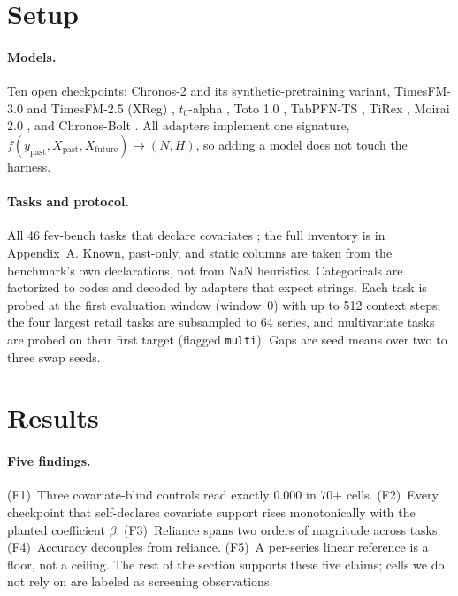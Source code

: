 \documentclass[letterpaper]{article}
\begin{document}
\section{Setup}
\paragraph{Models.} Ten open checkpoints: Chronos-2 \citep{ansari2025chronos2} and its
synthetic-pretraining variant, TimesFM-3.0 and TimesFM-2.5 (XReg)
\citep{das2024timesfm}, $t_0$-alpha \citep{meyer2026t0}, Toto 1.0 \citep{toto2024},
TabPFN-TS \citep{hoo2025tabpfn}, TiRex \citep{auer2025tirex}, Moirai 2.0
\citep{liu2025moirai2}, and Chronos-Bolt \citep{ansari2024chronos}. All adapters
implement one signature, $f(y_{\text{past}}, X_{\text{past}}, X_{\text{future}})
\rightarrow (N, H)$, so adding a model does not touch the harness.

\paragraph{Tasks and protocol.} All 46 fev-bench tasks that declare covariates
\citep{shchur2025fev}; the full inventory is in Appendix~A. Known, past-only, and
static columns are taken from the benchmark's own declarations, not from NaN
heuristics. Categoricals are factorized to codes and decoded by adapters that expect
strings. Each task is probed at the first evaluation window (window~0) with up to 512
context steps; the four largest retail tasks are subsampled to 64 series, and
multivariate tasks are probed on their first target (flagged \texttt{multi}).
Gaps are seed means over two to three swap seeds.

\section{Results}

\paragraph{Five findings.}
(F1)~Three covariate-blind controls read exactly $0.000$ in 70+ cells.
(F2)~Every checkpoint that self-declares covariate support rises monotonically with
the planted coefficient $\beta$.
(F3)~Reliance spans two orders of magnitude across tasks.
(F4)~Accuracy decouples from reliance.
(F5)~A per-series linear reference is a floor, not a ceiling.
The rest of the section supports these five claims; cells we do not rely on are
labeled as screening observations.
\end{document}
